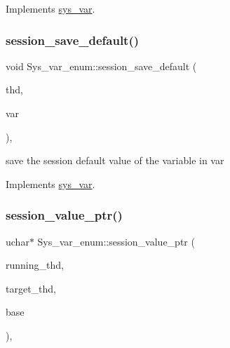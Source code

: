 Implements \mbox{\hyperlink{classsys__var}{sys\+\_\+var}}.

\mbox{\label{classSys__var__enum_a6105ba8d79f076e7ad271449c3e44d2f}} 
\subsubsection{\texorpdfstring{session\+\_\+save\+\_\+default()}{session\_save\_default()}}
{\footnotesize\ttfamily void Sys\+\_\+var\+\_\+enum\+::session\+\_\+save\+\_\+default (\begin{DoxyParamCaption}\item[{T\+HD $\ast$}]{thd,  }\item[{\mbox{\hyperlink{classset__var}{set\+\_\+var}} $\ast$}]{var }\end{DoxyParamCaption})\hspace{0.3cm}{\ttfamily [inline]}, {\ttfamily [virtual]}}

save the session default value of the variable in var 

Implements \mbox{\hyperlink{classsys__var}{sys\+\_\+var}}.

\mbox{\label{classSys__var__enum_aebb9d186c88b597ef5f17f0d4c9130c6}} 
\subsubsection{\texorpdfstring{session\+\_\+value\+\_\+ptr()}{session\_value\_ptr()}}
{\footnotesize\ttfamily uchar$\ast$ Sys\+\_\+var\+\_\+enum\+::session\+\_\+value\+\_\+ptr (\begin{DoxyParamCaption}\item[{T\+HD $\ast$}]{running\+\_\+thd,  }\item[{T\+HD $\ast$}]{target\+\_\+thd,  }\item[{L\+E\+X\+\_\+\+S\+T\+R\+I\+NG $\ast$}]{base }\end{DoxyParamCaption})\hspace{0.3cm}{\ttfamily [inline]}, {\ttfamily [virtual]}}

